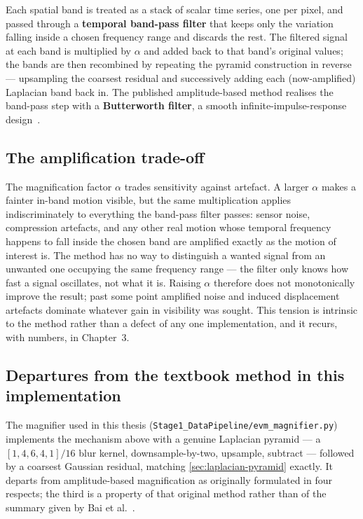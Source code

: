 Each spatial band is treated as a stack of scalar time series, one per pixel, and passed through a \textbf{temporal band-pass filter} that keeps only the variation falling inside a chosen frequency range and discards the rest. The filtered signal at each band is multiplied by $\alpha$ and added back to that band's original values; the bands are then recombined by repeating the pyramid construction in reverse --- upsampling the coarsest residual and successively adding each (now-amplified) Laplacian band back in. The published amplitude-based method realises the band-pass step with a \textbf{Butterworth filter}, a smooth infinite-impulse-response design~\cite{bai2021}.

\subsection{The amplification trade-off}
\label{sec:amplification-tradeoff}

The magnification factor $\alpha$ trades sensitivity against artefact. A larger $\alpha$ makes a fainter in-band motion visible, but the same multiplication applies indiscriminately to everything the band-pass filter passes: sensor noise, compression artefacts, and any other real motion whose temporal frequency happens to fall inside the chosen band are amplified exactly as the motion of interest is. The method has no way to distinguish a wanted signal from an unwanted one occupying the same frequency range --- the filter only knows how fast a signal oscillates, not what it is. Raising $\alpha$ therefore does not monotonically improve the result; past some point amplified noise and induced displacement artefacts dominate whatever gain in visibility was sought. This tension is intrinsic to the method rather than a defect of any one implementation, and it recurs, with numbers, in Chapter~3.

\subsection{Departures from the textbook method in this implementation}
\label{sec:evm-departures}

The magnifier used in this thesis (\texttt{Stage1\_DataPipeline/evm\_magnifier.py}) implements the mechanism above with a genuine Laplacian pyramid --- a $[1,4,6,4,1]/16$ blur kernel, downsample-by-two, upsample, subtract --- followed by a coarsest Gaussian residual, matching \autoref{sec:laplacian-pyramid} exactly. It departs from amplitude-based magnification as originally formulated in four respects; the third is a property of that original method rather than of the summary given by Bai et al.~\cite{bai2021}.

